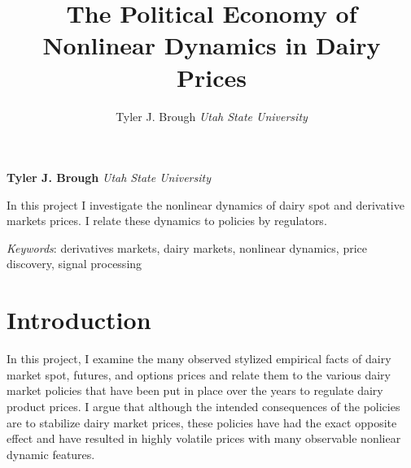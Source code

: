 \documentclass[11pt,]{article}
\title{The Political Economy of Nonlinear Dynamics in Dairy Prices  }
\author{\Large Tyler J. Brough\vspace{0.05in} \newline\normalsize\emph{Utah State University}  }
\date{}
\newcommand*{\authorfont}{\fontfamily{phv}\selectfont}
\renewenvironment{abstract}
 {{%
    \setlength{\leftmargin}{0mm}
    \setlength{\rightmargin}{\leftmargin}%
  }%
  \relax}
 {\endlist}
\begin{document}
	
%

{%
\setlength{\parindent}{0pt}
\thispagestyle{plain}
{\fontsize{18}{20}\selectfont\raggedright 
\maketitle  %

}

{
   \vskip 13.5pt\relax \normalsize\fontsize{11}{12} 
\textbf{\authorfont Tyler J. Brough} \hskip 15pt \emph{\small Utah State University}   

}

}







\begin{abstract}

    \hbox{\vrule height .2pt width 39.14pc}

    \vskip 8.5pt %

\noindent In this project I investigate the nonlinear dynamics of dairy spot and
derivative markets prices. I relate these dynamics to policies by
regulators.


\vskip 8.5pt \noindent \emph{Keywords}: derivatives markets, dairy markets, nonlinear dynamics, price discovery,
signal processing \par

    \hbox{\vrule height .2pt width 39.14pc}



\end{abstract}


\vskip 6.5pt

\noindent \doublespacing \section{Introduction}\label{introduction}

In this project, I examine the many observed stylized empirical facts of
dairy market spot, futures, and options prices and relate them to the
various dairy market policies that have been put in place over the years
to regulate dairy product prices. I argue that although the intended
consequences of the policies are to stabilize dairy market prices, these
policies have had the exact opposite effect and have resulted in highly
volatile prices with many observable nonliear dynamic features.
\end{document}
